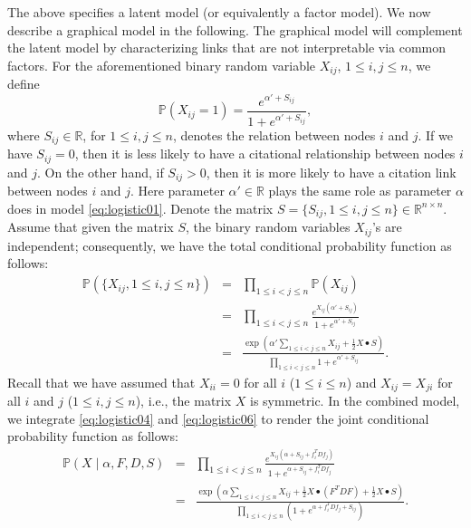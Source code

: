 \documentclass{article}
\begin{document}
The above specifies a latent model (or equivalently a factor model).
We now describe a graphical model in the following.
The graphical model will complement the latent model by characterizing links that are not interpretable via common factors.
For the aforementioned binary random variable $X_{ij}$, $1\le i,j \le n$, we define
\begin{equation}
\label{eq:logistic05}
\mathbb{P}(X_{ij}=1) = \frac{e^{\alpha' + S_{ij} }}{1 + e^{\alpha' + S_{ij} }},
\end{equation}
where $S_{ij} \in \mathbb{R}$, for $1\le i,j \le n$, denotes the relation between nodes $i$ and $j$.
If we have $S_{ij}=0$, then it is less likely to have a citational relationship between nodes $i$ and $j$.
On the other hand, if $S_{ij}>0$, then it is more likely to have a citation link between nodes $i$ and $j$.
Here parameter $\alpha' \in \mathbb{R}$ plays the same role as parameter $\alpha$ does in model \eqref{eq:logistic01}.
Denote the matrix $S = \{S_{ij}, 1\le i,j \le n \} \in \mathbb{R}^{n \times n}$.
Assume that given the matrix $S$, the binary random variables
$X_{ij}$'s are independent;
consequently, we have the total conditional probability function as follows:
\begin{eqnarray}
\mathbb{P}(\{X_{ij}, 1\le i,j \le n\})
&=& \prod_{1\le i<j \le n} \mathbb{P}(X_{ij}) \nonumber \\
&=& \prod_{1\le i<j \le n}  \frac{e^{X_{ij}(\alpha' + S_{ij}) }}{1 + e^{\alpha' + S_{ij} }} \nonumber \\
&=& \frac{\exp(\alpha' \sum_{1\le i< j\le n}X_{ij} +\frac{1}{2} X \bullet S)}{\prod_{1\le i<j \le n}  1 + e^{\alpha' + S_{ij} }}.
\label{eq:logistic06}
\end{eqnarray}
Recall that we have assumed that $X_{ii}=0$ for all $i$ ($1\le i \le n$) and $X_{ij} = X_{ji}$ for all $i$ and $j$ ($1\le i,j \le n$), i.e., the matrix $X$ is symmetric.
In the combined model, we integrate \eqref{eq:logistic04} and
\eqref{eq:logistic06} to render the joint conditional probability function as follows:
\begin{eqnarray}
\label{eq:logistic07}
\mathbb{P}(X \mid \alpha,  F, D, S)
&=&  \prod_{1\le i<j \le n}
\frac{e^{X_{ij}(\alpha + S_{ij} + f_i^T D f_j) }}{1 + e^{\alpha + S_{ij}+ f_i^T D f_j}} \nonumber \\
&=& \frac{\exp\left(\alpha \sum_{1\le i< j\le n}X_{ij} +\frac{1}{2} X \bullet (F^T D F) +\frac{1}{2} X \bullet S\right)}{\prod_{1\le i<j \le n}  \left(1 + e^{\alpha + f_i^T D f_j +S_{ij}}\right) }.
\end{eqnarray}
\end{document}
